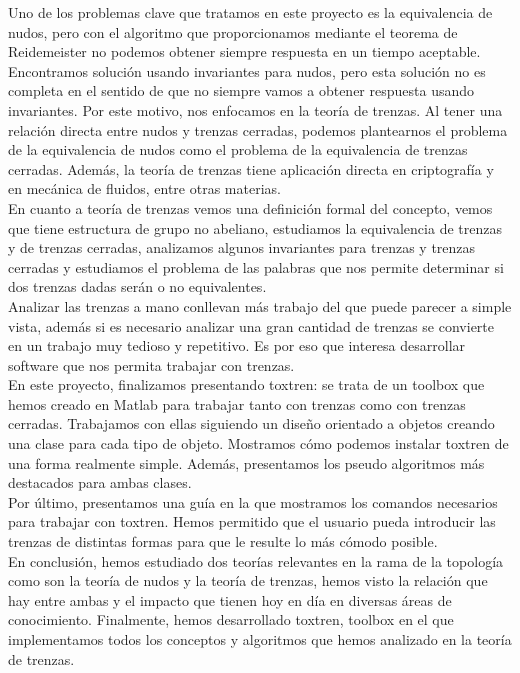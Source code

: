 Uno de los problemas clave que tratamos en este proyecto es la equivalencia de nudos, pero con el algoritmo que proporcionamos mediante el teorema de Reidemeister no podemos obtener siempre respuesta en un tiempo aceptable. Encontramos solución usando invariantes para nudos, pero esta solución no es completa en el sentido de que no siempre vamos a obtener respuesta usando invariantes. Por este motivo, nos enfocamos en la teoría de trenzas. Al tener una relación directa entre nudos y trenzas cerradas, podemos plantearnos el problema de la equivalencia de nudos como el problema de la equivalencia de trenzas cerradas. Además, la teoría de trenzas tiene aplicación directa en criptografía y en mecánica de fluidos, entre otras  materias.\\ 

En cuanto a teoría de trenzas vemos una definición formal del concepto, vemos que tiene estructura de grupo no abeliano, estudiamos la equivalencia de trenzas y de trenzas cerradas, analizamos algunos invariantes para trenzas y trenzas cerradas y estudiamos el problema de las palabras que nos permite determinar si dos trenzas dadas serán o no equivalentes. \\

Analizar las trenzas a mano conllevan más trabajo del que puede parecer a simple vista, además si es necesario analizar una gran cantidad de trenzas se convierte en un trabajo muy tedioso y repetitivo. Es por eso que interesa desarrollar software que nos permita trabajar con trenzas. \\


En este proyecto, finalizamos presentando toxtren: se trata de un toolbox que hemos creado en Matlab para trabajar tanto con trenzas como con trenzas cerradas. Trabajamos con ellas siguiendo un diseño orientado a objetos creando una clase para cada tipo de objeto. Mostramos cómo podemos instalar toxtren de una forma realmente simple. Además, presentamos los pseudo algoritmos más destacados para ambas clases.\\
Por último, presentamos una guía en la que mostramos los comandos necesarios para trabajar con toxtren. Hemos permitido que el usuario pueda introducir las trenzas de distintas formas para que le resulte lo más cómodo posible. \\

En conclusión, hemos estudiado dos teorías relevantes en la rama de la topología como son la teoría de nudos y la teoría de trenzas, hemos visto la relación que hay entre ambas y el impacto que tienen hoy en día en diversas áreas de conocimiento. Finalmente, hemos desarrollado toxtren, toolbox en el que implementamos todos los conceptos y algoritmos que hemos analizado en la teoría de trenzas. 


